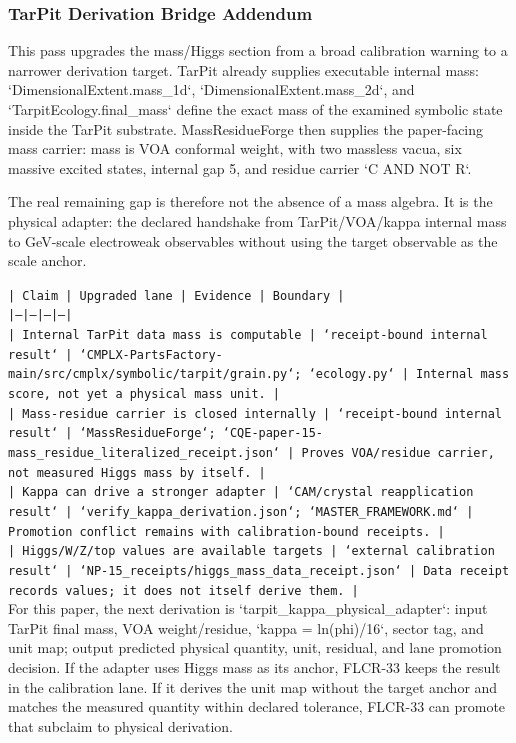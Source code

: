 \documentclass[11pt]{article}
\begin{document}
\subsubsection*{TarPit Derivation Bridge Addendum}

This pass upgrades the mass/Higgs section from a broad calibration warning to a narrower derivation target. TarPit already supplies executable internal mass: `DimensionalExtent.mass\_1d`, `DimensionalExtent.mass\_2d`, and `TarpitEcology.final\_mass` define the exact mass of the examined symbolic state inside the TarPit substrate. MassResidueForge then supplies the paper-facing mass carrier: mass is VOA conformal weight, with two massless vacua, six massive excited states, internal gap 5, and residue carrier `C AND NOT R`.

The real remaining gap is therefore not the absence of a mass algebra. It is the physical adapter: the declared handshake from TarPit/VOA/kappa internal mass to GeV-scale electroweak observables without using the target observable as the scale anchor.

\noindent\texttt{| Claim | Upgraded lane | Evidence | Boundary |}\\
\noindent\texttt{|---|---|---|---|}\\
\noindent\texttt{| Internal TarPit data mass is computable | `receipt-bound internal result` | `CMPLX-PartsFactory-main/src/cmplx/symbolic/tarpit/grain.py`; `ecology.py` | Internal mass score, not yet a physical mass unit. |}\\
\noindent\texttt{| Mass-residue carrier is closed internally | `receipt-bound internal result` | `MassResidueForge`; `CQE-paper-15-mass\_residue\_literalized\_receipt.json` | Proves VOA/residue carrier, not measured Higgs mass by itself. |}\\
\noindent\texttt{| Kappa can drive a stronger adapter | `CAM/crystal reapplication result` | `verify\_kappa\_derivation.json`; `MASTER\_FRAMEWORK.md` | Promotion conflict remains with calibration-bound receipts. |}\\
\noindent\texttt{| Higgs/W/Z/top values are available targets | `external calibration result` | `NP-15\_receipts/higgs\_mass\_data\_receipt.json` | Data receipt records values; it does not itself derive them. |}\\

For this paper, the next derivation is `tarpit\_kappa\_physical\_adapter`: input TarPit final mass, VOA weight/residue, `kappa = ln(phi)/16`, sector tag, and unit map; output predicted physical quantity, unit, residual, and lane promotion decision. If the adapter uses Higgs mass as its anchor, FLCR-33 keeps the result in the calibration lane. If it derives the unit map without the target anchor and matches the measured quantity within declared tolerance, FLCR-33 can promote that subclaim to physical derivation.
\end{document}
